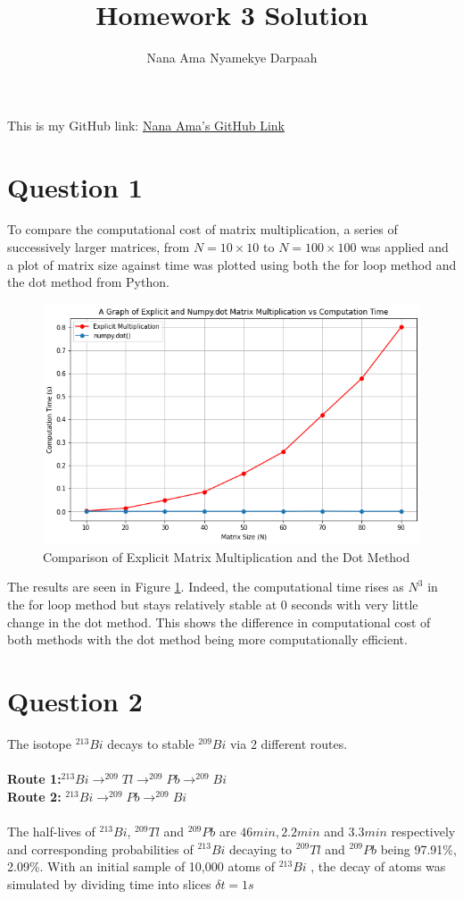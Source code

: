 \documentclass[11pt]{article}
\title{Homework 3 Solution}
\author{Nana Ama Nyamekye Darpaah}
\begin{document}
	\maketitle
	This is my GitHub link: \href{https://github.com/nnd2016/phys-ga2000.git}{Nana Ama's GitHub Link}
	
\section{Question 1}
To compare the computational cost of matrix multiplication, a series of successively larger matrices, from $N = 10 \times 10$ to $N = 100 \times 100$ was applied and a plot of matrix size against time was plotted using both the for loop method and the dot method from Python. 

\begin{figure}[!h]
	\centering
	\includegraphics[width=0.7\linewidth]{matrix_multiplication.png}
	\caption{Comparison of Explicit Matrix Multiplication and the Dot Method}
	\label{fig:matrix}
\end{figure}



The results are seen in Figure \ref{fig:matrix}. Indeed, the computational time rises as $N^{3}$ in the for loop method but stays relatively stable at 0 seconds with very little change in the dot method. This shows the difference in computational cost of both methods with the dot method being more computationally efficient.

\section{Question 2}
The isotope $^{213}Bi$ decays to stable $^{209}Bi$ via 2 different routes. \\
\\
\textbf{Route 1:}$^{213}Bi \rightarrow ^{209}Tl \rightarrow ^{209}Pb \rightarrow ^{209}Bi$ \\
\textbf{Route 2:} $^{213}Bi \rightarrow ^{209}Pb \rightarrow ^{209}Bi$ \\
\\
 The half-lives of $^{213}Bi$, $^{209}Tl$ and $^{209}Pb$ are $46 min, 2.2 min$ and $3.3 min$ respectively  and corresponding probabilities of $^{213}Bi$ decaying to $^{209}Tl$ and $^{209}Pb$ being 97.91\%, 2.09\%.
With an initial sample of 10,000 atoms of $^{213}Bi$ , the decay of atoms was simulated by dividing time into slices $\delta t = 1 s$
\end{document}

